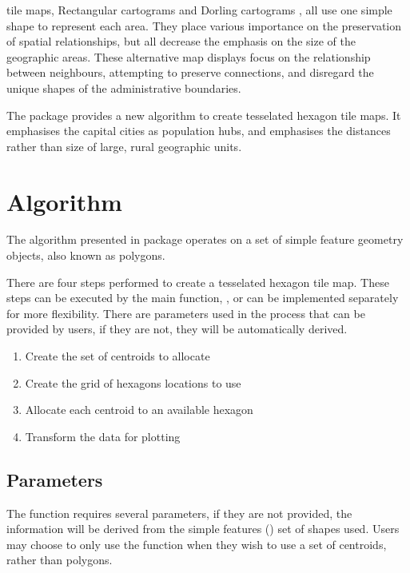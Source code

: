 \documentclass[
]{jss}
\providecommand{\tightlist}{%
  \setlength{\itemsep}{0pt}\setlength{\parskip}{0pt}}
\begin{document}
tile maps, Rectangular cartograms \citep{ORC} and Dorling cartograms
\citep{ACTUC}, all use one simple shape to represent each area. They
place various importance on the preservation of spatial relationships,
but all decrease the emphasis on the size of the geographic areas. These
alternative map displays focus on the relationship between neighbours,
attempting to preserve connections, and disregard the unique shapes of
the administrative boundaries.

The  package provides a new algorithm to create tesselated
hexagon tile maps. It emphasises the capital cities as population hubs,
and emphasises the distances rather than size of large, rural geographic
units.

\hypertarget{algorithm}{%
\section{Algorithm}\label{algorithm}}

The algorithm presented in  package operates on a set of
simple feature geometry objects, also known as  \citep{sf}
polygons.

There are four steps performed to create a tesselated hexagon tile map.
These steps can be executed by the main function, ,
or can be implemented separately for more flexibility. There are
parameters used in the process that can be provided by users, if they
are not, they will be automatically derived.

\begin{enumerate}
\def\labelenumi{\arabic{enumi}.}
\tightlist
\item
  Create the set of centroids to allocate
\item
  Create the grid of hexagons locations to use
\item
  Allocate each centroid to an available hexagon
\item
  Transform the data for plotting
\end{enumerate}

\hypertarget{parameters}{%
\subsection{Parameters}\label{parameters}}

The  function requires several parameters, if they
are not provided, the information will be derived from the simple
features () set of shapes used. Users may choose to only use the
 function when they wish to use a set of centroids,
rather than  polygons.
\end{document}
